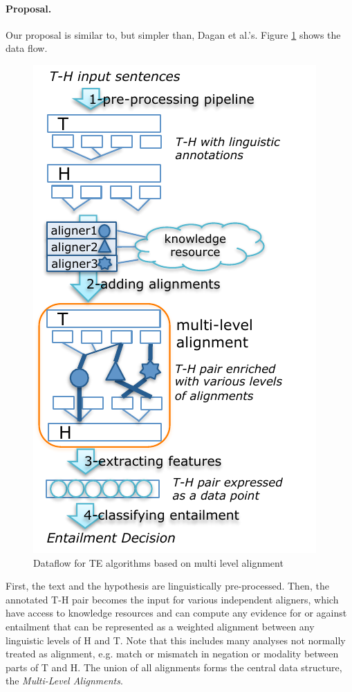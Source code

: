 \documentclass[11pt,a4paper]{article}
\begin{document}
\paragraph{Proposal.} Our proposal is similar to, but simpler than,
Dagan et al.'s. Figure \ref{fig:1} shows the data flow.

\begin{figure}[t!b]
  \centering
  \includegraphics[width=0.9\columnwidth]{figures/figure1.pdf}
  \caption{Dataflow for TE algorithms based on multi level alignment}
  \label{fig:1}
\end{figure}

First, the text and the hypothesis are linguistically
pre-processed. Then, the annotated T-H pair becomes the input for
various independent aligners, which have access to knowledge resources
and can compute any evidence for or against entailment that can be
represented as a weighted alignment between any linguistic levels of H
and T.
Note that this includes many analyses not normally treated as
alignment, e.g. match or mismatch in negation or modality between
parts of T and H. %
The union of all alignments forms the 
central data structure, the {\em Multi-Level Alignments}.
\end{document}
